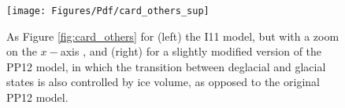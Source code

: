 \begin{figure}
\texttt{[image: Figures/Pdf/card\_others\_sup]}
\caption
{
As Figure \ref{fig:card_others} for (left) the I11 model, but
with a zoom on the $x-$axis , and (right) for a slightly
modified version of the PP12 model, in which the transition
between deglacial and glacial states is also controlled by 
ice volume, as opposed to the original PP12 model. 
}
\label{fig:card_others_sup}
\end{figure}
